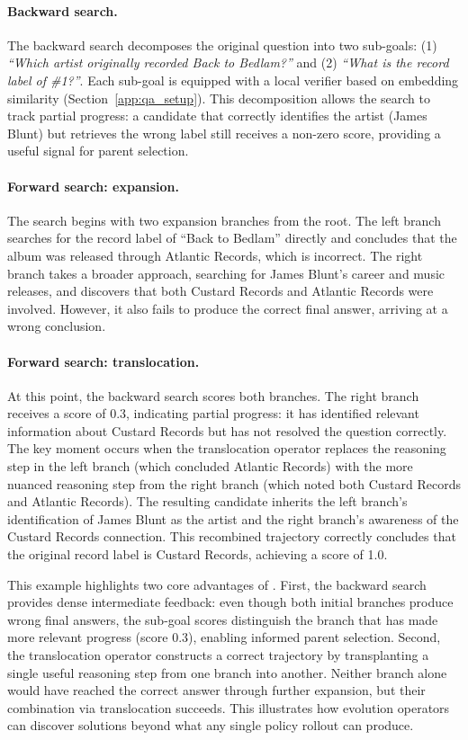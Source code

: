 \paragraph{Backward search.} The backward search decomposes the original question into two sub-goals: (1) \textit{``Which artist originally recorded Back to Bedlam?''} and (2) \textit{``What is the record label of \#1?''}. Each sub-goal is equipped with a local verifier based on embedding similarity (Section~\ref{app:qa_setup}). This decomposition allows the search to track partial progress: a candidate that correctly identifies the artist (James Blunt) but retrieves the wrong label still receives a non-zero score, providing a useful signal for parent selection.

\paragraph{Forward search: expansion.} The search begins with two expansion branches from the root. The left branch searches for the record label of ``Back to Bedlam'' directly and concludes that the album was released through Atlantic Records, which is incorrect. The right branch takes a broader approach, searching for James Blunt's career and music releases, and discovers that both Custard Records and Atlantic Records were involved. However, it also fails to produce the correct final answer, arriving at a wrong conclusion.

\paragraph{Forward search: translocation.} At this point, the backward search scores both branches. The right branch receives a score of 0.3, indicating partial progress: it has identified relevant information about Custard Records but has not resolved the question correctly. The key moment occurs when the translocation operator replaces the reasoning step in the left branch (which concluded Atlantic Records) with the more nuanced reasoning step from the right branch (which noted both Custard Records and Atlantic Records). The resulting candidate inherits the left branch's identification of James Blunt as the artist and the right branch's awareness of the Custard Records connection. This recombined trajectory correctly concludes that the original record label is Custard Records, achieving a score of 1.0.

This example highlights two core advantages of \ours. First, the backward search provides dense intermediate feedback: even though both initial branches produce wrong final answers, the sub-goal scores distinguish the branch that has made more relevant progress (score 0.3), enabling informed parent selection. Second, the translocation operator constructs a correct trajectory by transplanting a single useful reasoning step from one branch into another. Neither branch alone would have reached the correct answer through further expansion, but their combination via translocation succeeds. This illustrates how evolution operators can discover solutions beyond what any single policy rollout can produce.

